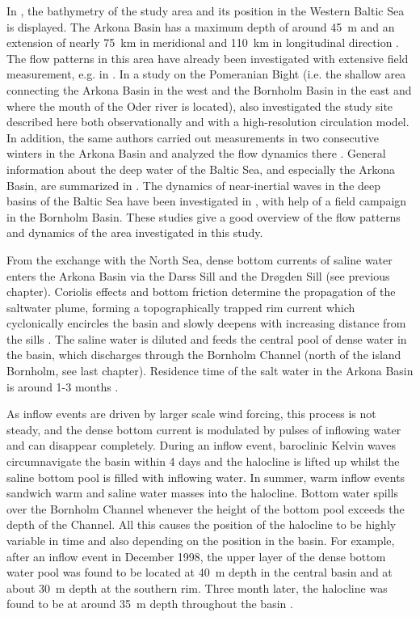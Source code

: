 In , the bathymetry of the study area and its position in the 
Western Baltic Sea is displayed. The Arkona Basin has a maximum depth of 
around 45~m and an extension of nearly 75~km in meridional and 110~km in 
longitudinal direction \citep[][]{lass2005}. \FloatBarrier The flow patterns in 
this area 
have already been investigated with extensive field measurement, e.g. in 
\cite{lass1993}. In a study on the Pomeranian Bight (i.e. the shallow area 
connecting the Arkona Basin in the west and the Bornholm Basin in the east and 
where the mouth of the Oder river is located), \cite{lass2001} also investigated 
the study site described here both observationally and with a high-resolution 
circulation model. In addition, the same authors carried out measurements in 
two consecutive winters in the Arkona Basin and analyzed the flow dynamics 
there \citep[][]{lass2003,lass2005}. General information about the deep water 
of the Baltic Sea, and especially the Arkona Basin, are summarized in 
\cite{meier2006}. The dynamics of near-inertial waves in the deep basins 
of the Baltic Sea have been investigated in \cite{vanderlee2011}, with help of 
a field campaign in the Bornholm Basin. These studies give a good overview of 
the flow patterns and dynamics of the area investigated in this study.

From the exchange with the North Sea, dense bottom currents of saline water 
enters the Arkona Basin via the Darss Sill and the Dr{\o}gden Sill (see 
previous chapter). Coriolis effects and bottom friction determine the 
propagation of the saltwater plume, forming a topographically trapped rim 
current which cyclonically encircles the basin and slowly deepens with 
increasing distance from the sills \citep{lass2005}. The saline water is 
diluted and feeds the central pool of dense water in the basin, which 
discharges through the Bornholm Channel (north of the island Bornholm, see last 
chapter). Residence time of the salt water in the Arkona Basin is around 1-3 
months \citep[][]{lass2005, meier2006}.

As inflow events are driven by larger scale wind forcing, this process is not 
steady, and the dense bottom current is modulated by pulses of inflowing 
water and can disappear completely. During an inflow event, baroclinic Kelvin 
waves circumnavigate the basin within 4 days and the halocline is lifted up 
whilst the saline bottom pool is filled with inflowing water. In summer, warm 
inflow events sandwich warm and saline water masses into the halocline. Bottom 
water spills over the Bornholm Channel whenever the height of the bottom pool 
exceeds the depth of the Channel. All this causes the position of the halocline 
to be highly variable in time and also depending on the position in the basin. 
For example, after an inflow event in December 1998, the upper layer of 
the dense bottom water pool was found to be located at 40~m depth in the central 
basin and at about 30~m depth at the southern rim. Three month later, the 
halocline was found to be at around 35~m depth throughout the basin 
\citep[][]{lass2005}.

